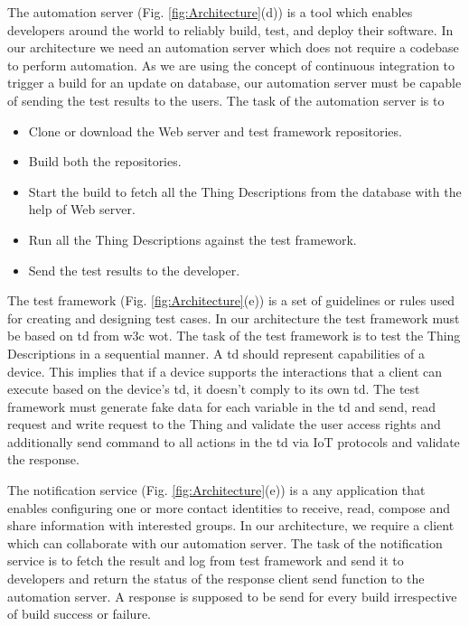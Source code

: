 \documentclass[conference]{IEEEtran}
\theoremstyle{definition}
\begin{document}
The automation server (Fig. \ref{fig:Architecture}(d)) is a tool which enables developers around the world to reliably build, test, and deploy their software. 
In our architecture we need an automation server which does not require a codebase to perform automation. 
As we are using the concept of continuous integration to trigger a build for an update on database, our automation server must be capable of sending the test results to the users. 
The task of the automation server is to 
\begin{itemize}
  \item Clone or download the Web server and test framework repositories.
  \item Build both the repositories.
  \item Start the build to fetch all the Thing Descriptions from the database with the help of Web server.
  \item Run all the Thing Descriptions against the test framework.
  \item Send the test results to the developer.
\end{itemize}

The test framework (Fig. \ref{fig:Architecture}(e)) is a set of guidelines or rules used for creating and designing test cases. 
In our architecture the test framework must be based on \ac{td} from \ac{w3c} \ac{wot}. 
The task of the test framework is to test the Thing Descriptions in a sequential manner. 
A \ac{td} should represent capabilities of a device. 
This implies that if a device supports the interactions that a client can execute based on the device's \ac{td}, it doesn't comply to its own \ac{td}. 
The test framework must generate fake data for each variable in the \ac{td} and send, read request and write request to the Thing and validate the user access rights and additionally send command to all actions in the \ac{td} via IoT protocols and validate the response. 

The notification service (Fig. \ref{fig:Architecture}(e)) is a any application that enables configuring one or more contact identities to receive, read, compose and share information with interested groups. 
In our architecture, we require a client which can collaborate with our automation server. 
The task of the notification service is to fetch the result and log from test framework and send it to developers and return the status of the response client send function to the automation server. 
A response is supposed to be send for every build irrespective of build success or failure.
\end{document}
